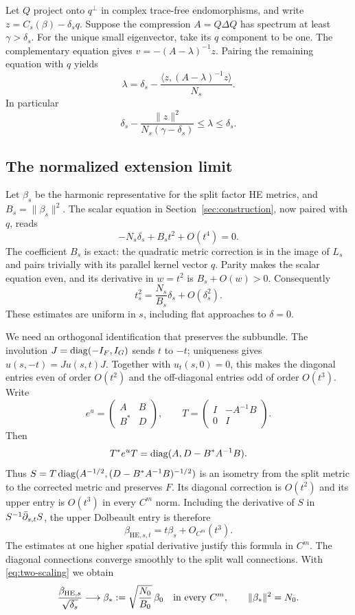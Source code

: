 Let $Q$ project onto $q^\perp$ in complex trace-free endomorphisms,
and write $z=C_s(\beta)-\delta_sq$. Suppose the compression
$A=Q\Delta Q$ has spectrum at least $\gamma>\delta_s$.
For the unique small eigenvector, take its $q$ component to be one.
The complementary equation gives $v=-(A-\lambda)^{-1}z$.
Pairing the remaining equation with $q$ yields
\begin{equation}\label{eq:exact-schur-two}
 \lambda=\delta_s-\frac{\langle z,(A-\lambda)^{-1}z\rangle}{N_s}.
\end{equation}
In particular
\[
 \delta_s-\frac{\|z\|^2}{N_s(\gamma-\delta_s)}
       \le\lambda\le\delta_s.
\]

\subsection{The normalized extension limit}
Let $\beta_s$ be the harmonic representative for the split factor
HE metrics, and $B_s=\|\beta_s\|^2$. The scalar equation in
Section~\ref{sec:construction}, now paired with $q$, reads
\[
 -N_s\delta_s+B_st^2+O(t^4)=0.
\]
The coefficient $B_s$ is exact: the quadratic metric correction is
in the image of $L_s$ and pairs trivially with its parallel kernel
vector $q$. Parity makes the scalar equation even, and its derivative
in $w=t^2$ is $B_s+O(w)>0$. Consequently
\begin{equation}\label{eq:two-scaling}
 t_s^2=\frac{N_s}{B_s}\delta_s+O(\delta_s^2).
\end{equation}
These estimates are uniform in $s$, including flat approaches to
$\delta=0$.

We need an orthogonal identification that preserves the subbundle.
The involution $J=\operatorname{diag}(-I_F,I_G)$ sends $t$ to $-t$; uniqueness
gives $u(s,-t)=Ju(s,t)J$. Together with $u_t(s,0)=0$, this makes
the diagonal entries even of order $O(t^2)$ and the off-diagonal
entries odd of order $O(t^3)$. Write
\[
 e^u=\begin{pmatrix}A&B\\B^*&D\end{pmatrix},\qquad
 T=\begin{pmatrix}I&-A^{-1}B\\0&I\end{pmatrix}.
\]
Then
\[
 T^*e^uT=\operatorname{diag}(A,D-B^*A^{-1}B).
\]
Thus
$S=T\operatorname{diag}(A^{-1/2},(D-B^*A^{-1}B)^{-1/2})$ is an isometry
from the split metric to the corrected metric and preserves $F$.
Its diagonal correction is $O(t^2)$ and its upper entry is $O(t^3)$
in every $C^m$ norm. Including the derivative of $S$ in
$S^{-1}\bar\partial_{s,t}S$, the upper Dolbeault entry is therefore
\[
 \beta_{\mathrm{HE},s,t}=t\beta_s+O_{C^m}(t^3).
\]
The estimates at one higher spatial derivative justify this formula
in $C^m$. The diagonal connections converge smoothly to the split
wall connections. With \eqref{eq:two-scaling} we obtain
\begin{equation}\label{eq:normalized-beta}
 \frac{\beta_{\mathrm{HE},s}}{\sqrt{\delta_s}}
     \longrightarrow\beta_*:=\sqrt{\frac{N_0}{B_0}}\,\beta_0
 \quad\hbox{in every }C^m,\qquad \|\beta_*\|^2=N_0.
\end{equation}

